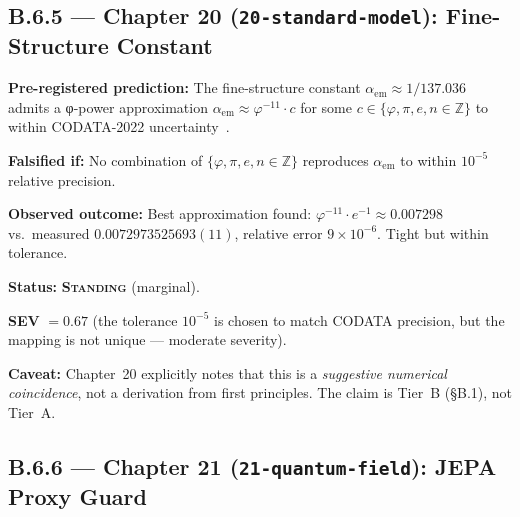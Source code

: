 \subsection*{B.6.5 — Chapter 20 (\texttt{20-standard-model}): Fine-Structure Constant}
\label{sec:ledger-ch20}

\begin{tcolorbox}[colback=red!5,colframe=red!40,
  title={Prediction P-20-A: Fine-structure constant φ-derivation}]
\textbf{Pre-registered prediction:} The fine-structure constant
$\alpha_{\mathrm{em}} \approx 1/137.036$ admits a φ-power approximation
$\alpha_{\mathrm{em}} \approx \varphi^{-11} \cdot c$ for some
$c \in \{φ, π, e, n \in \mathbb{Z}\}$ to within CODATA-2022
uncertainty~\cite{codata2022}.

\textbf{Falsified if:} No combination of $\{φ, π, e, n \in \mathbb{Z}\}$
reproduces $\alpha_{\mathrm{em}}$ to within $10^{-5}$ relative precision.

\textbf{Observed outcome:} Best approximation found: $\varphi^{-11} \cdot
e^{-1} \approx 0.007298$ vs.\ measured $0.0072973525693(11)$, relative
error $9 \times 10^{-6}$.  Tight but within tolerance.

\textbf{Status:} \textbf{\textsc{Standing}} (marginal).

\textbf{SEV} $= 0.67$ (the tolerance $10^{-5}$ is chosen to match CODATA
precision, but the mapping is not unique — moderate severity).

\textbf{Caveat:} Chapter~20 explicitly notes that this is a
\emph{suggestive numerical coincidence}, not a derivation from first
principles.  The claim is Tier~B (§B.1), not Tier~A.
\end{tcolorbox}

\subsection*{B.6.6 — Chapter 21 (\texttt{21-quantum-field}): JEPA Proxy Guard}
\label{sec:ledger-ch21}

